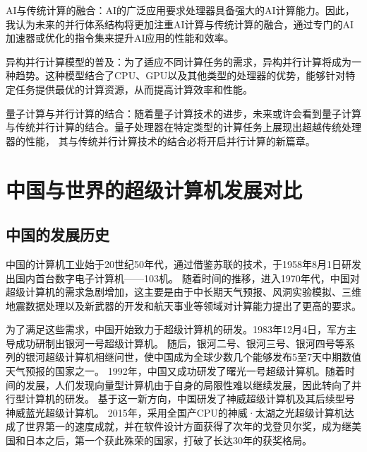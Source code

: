 \documentclass{ctexart}
\begin{document}
AI与传统计算的融合：AI的广泛应用要求处理器具备强大的AI计算能力。因此，我认为未来的并行体系结构将更加注重AI计算与传统计算的融合，通过专门的AI加速器或优化的指令集来提升AI应用的性能和效率。

异构并行计算模型的普及：为了适应不同计算任务的需求，异构并行计算将成为一种趋势。这种模型结合了CPU、GPU以及其他类型的处理器的优势，能够针对特定任务提供最优的计算资源，从而提高计算效率和性能。

量子计算与并行计算的结合：随着量子计算技术的进步，未来或许会看到量子计算与传统并行计算的结合。量子处理器在特定类型的计算任务上展现出超越传统处理器的性能，
其与传统并行计算技术的结合必将开启并行计算的新篇章。
\section{中国与世界的超级计算机发展对比}
\subsection{中国的发展历史}
中国的计算机工业始于20世纪50年代，通过借鉴苏联的技术，于1958年8月1日研发出国内首台数字电子计算机——103机。\cite{103Machine}
随着时间的推移，进入1970年代，中国对超级计算机的需求急剧增加，这主要是由于中长期天气预报、风洞实验模拟、三维地震数据处理以及新武器的开发和航天事业等领域对计算能力提出了更高的要求。

为了满足这些需求，中国开始致力于超级计算机的研发。1983年12月4日，军方主导成功研制出银河一号超级计算机。\cite{GalaxyToTianhe}
随后，银河二号、银河三号、银河四号等系列的银河超级计算机相继问世，使中国成为全球少数几个能够发布5至7天中期数值天气预报的国家之一。
1992年，中国又成功研发了曙光一号超级计算机。随着时间的发展，人们发现向量型计算机由于自身的局限性难以继续发展，因此转向了并行型计算机的研发。
基于这一新方向，中国研发了神威超级计算机及其后续型号神威蓝光超级计算机。\cite{ShenweiBluelight}
2015年，采用全国产CPU的神威·太湖之光超级计算机达成了世界第一的速度成就，并在软件设计方面获得了次年的戈登贝尔奖，成为继美国和日本之后，第一个获此殊荣的国家，打破了长达30年的获奖格局。\cite{SupercomputingAward}
\end{document}
